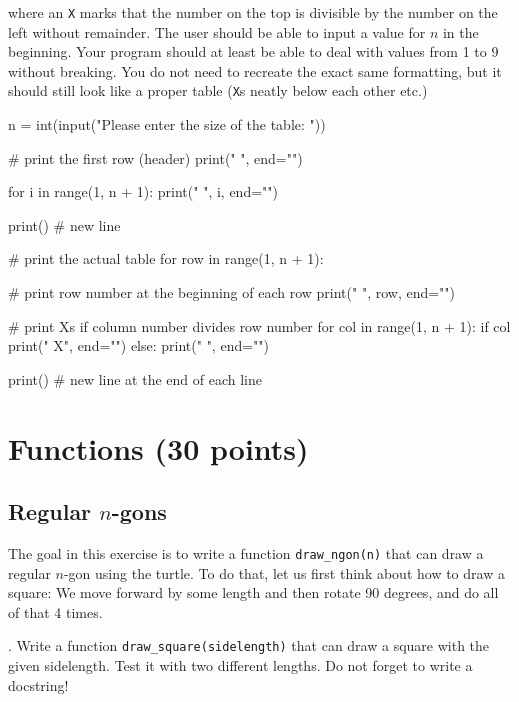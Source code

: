 \noindent where an \texttt{X} marks that the number on the top is divisible by the number on the left without remainder. The user should be able to input a value for $n$ in the beginning. Your program should at least be able to deal with values from 1 to 9 without breaking. You do not need to recreate the exact same formatting, but it should still look like a proper table (\texttt{X}s neatly below each other etc.)

\vspace{1em}

\begin{solution}
    \begin{pythoncode}
n = int(input("Please enter the size of the table: "))

# print the first row (header)
print("    ", end="")

for i in range(1, n + 1):
    print("  ", i, end="")

print() # new line

# print the actual table
for row in range(1, n + 1):

    # print row number at the beginning of each row
    print("  ", row, end="")

    # print Xs if column number divides row number
    for col in range(1, n + 1):
        if col %
            print("   X", end="")
        else:
            print("    ", end="")

    print() # new line at the end of each line
    \end{pythoncode}
\end{solution}


\section{Functions (30 points)}

\subsection{Regular $n$-gons}

The goal in this exercise is to write a function \texttt{draw\_ngon(n)} that can draw a regular $n$-gon using the turtle. To do that, let us first think about how to draw a square: We move forward by some length and then rotate 90 degrees, and do all of that 4 times.

\vspace{1em}

. Write a function \texttt{draw\_square(sidelength)} that can draw a square with the given sidelength. Test it with two different lengths. Do not forget to write a docstring!

